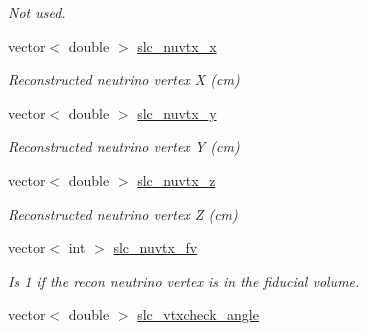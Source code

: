 \begin{DoxyCompactItemize}
\begin{DoxyCompactList}\small\item\em Not used. \end{DoxyCompactList}\item 
\hypertarget{classUBXSecEvent_ac97e86f7559ceb52bacb97bd60c25f09}{vector$<$ double $>$ \hyperlink{classUBXSecEvent_ac97e86f7559ceb52bacb97bd60c25f09}{slc\-\_\-nuvtx\-\_\-x}}\label{classUBXSecEvent_ac97e86f7559ceb52bacb97bd60c25f09}

\begin{DoxyCompactList}\small\item\em Reconstructed neutrino vertex X (cm) \end{DoxyCompactList}\item 
\hypertarget{classUBXSecEvent_aabba0cbb738793a9713deb8888d3919b}{vector$<$ double $>$ \hyperlink{classUBXSecEvent_aabba0cbb738793a9713deb8888d3919b}{slc\-\_\-nuvtx\-\_\-y}}\label{classUBXSecEvent_aabba0cbb738793a9713deb8888d3919b}

\begin{DoxyCompactList}\small\item\em Reconstructed neutrino vertex Y (cm) \end{DoxyCompactList}\item 
\hypertarget{classUBXSecEvent_abc7e1a40fd182e817c83e5e4066eeb07}{vector$<$ double $>$ \hyperlink{classUBXSecEvent_abc7e1a40fd182e817c83e5e4066eeb07}{slc\-\_\-nuvtx\-\_\-z}}\label{classUBXSecEvent_abc7e1a40fd182e817c83e5e4066eeb07}

\begin{DoxyCompactList}\small\item\em Reconstructed neutrino vertex Z (cm) \end{DoxyCompactList}\item 
\hypertarget{classUBXSecEvent_ae5160345d6d863bbe3ad2abb19298dc6}{vector$<$ int $>$ \hyperlink{classUBXSecEvent_ae5160345d6d863bbe3ad2abb19298dc6}{slc\-\_\-nuvtx\-\_\-fv}}\label{classUBXSecEvent_ae5160345d6d863bbe3ad2abb19298dc6}

\begin{DoxyCompactList}\small\item\em Is 1 if the recon neutrino vertex is in the fiducial volume. \end{DoxyCompactList}\item 
\hypertarget{classUBXSecEvent_af9855bb4f1c558d9032c3059beb49015}{vector$<$ double $>$ \hyperlink{classUBXSecEvent_af9855bb4f1c558d9032c3059beb49015}{slc\-\_\-vtxcheck\-\_\-angle}}\label{classUBXSecEvent_af9855bb4f1c558d9032c3059beb49015}


\end{DoxyCompactItemize}
